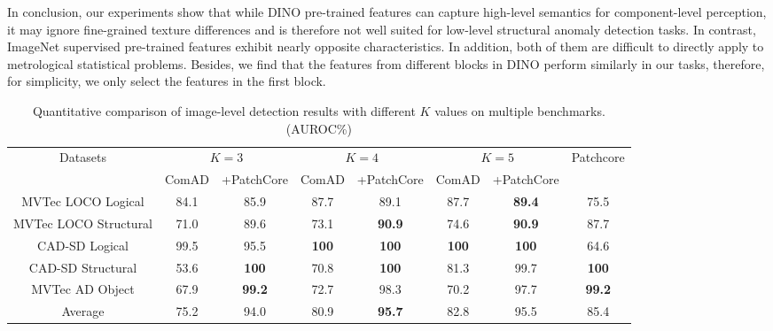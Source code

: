 \documentclass[final,5p,times,twocolumn]{elsarticle}
\begin{document}
In conclusion, our experiments show that while DINO pre-trained features can capture high-level semantics for component-level perception, it may ignore fine-grained texture differences and is therefore not well suited for low-level structural anomaly detection tasks. In contrast, ImageNet supervised pre-trained features exhibit nearly opposite characteristics. In addition, both of them are difficult to directly apply to metrological statistical problems. Besides, we find that the features from different blocks in DINO perform similarly in our tasks, therefore, for simplicity, we only select the features in the first block.

\begin{table*}[]
\caption{Quantitative comparison of image-level detection results with different $K$ values on multiple benchmarks. (AUROC\%)}
\centering
\label{Table5}
\begin{tabular}{c|cc|cc|cc|c}
\hline
\multirow{2}{*}{Datasets} & \multicolumn{2}{c|}{$K=3$} & \multicolumn{2}{c|}{$K=4$} & \multicolumn{2}{c|}{$K=5$} & \multirow{2}{*}{Patchcore} \\
                          & ComAD    & +PatchCore    & ComAD    & +PatchCore    & ComAD    & +PatchCore    &                            \\ \hline
MVTec LOCO Logical        & 84.1     & 85.9          & 87.7     & 89.1          & 87.7     & \textbf{89.4}          & 75.5                       \\
MVTec LOCO Structural     & 71.0     & 89.6          & 73.1     & \textbf{90.9}          & 74.6     & \textbf{90.9}          & 87.7                       \\
CAD-SD Logical            & 99.5     & 95.5          & \textbf{100}      & \textbf{100}           & \textbf{100}      & \textbf{100}           & 64.6                       \\
CAD-SD Structural         & 53.6     & \textbf{100}           & 70.8     & \textbf{100}           & 81.3     & 99.7          & \textbf{100}                        \\
MVTec AD Object           & 67.9     & \textbf{99.2}          & 72.7     & 98.3          & 70.2     & 97.7          & \textbf{99.2}                       \\ \hline
Average                   & 75.2     & 94.0          & 80.9     & \textbf{95.7}          & 82.8     & 95.5          & 85.4                       \\ \hline
\end{tabular}
\end{table*}
\end{document}
